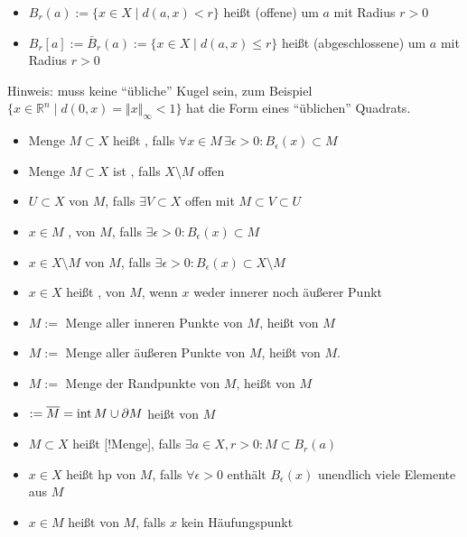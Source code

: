\begin{definition}
    \begin{itemize}
    \item $B_r(a):=\{ x\in X \mid d(a,x) < r \}$ heißt (offene)  um $a$ mit Radius $r > 0$
    \item $B_r[a]:=\bar{B}_r(a):=\{ x\in X \mid d(a,x) \le r \}$ heißt (abgeschlossene)  um $a$ mit Radius $r > 0$
    \end{itemize}
    Hinweis: muss keine "`übliche"' Kugel sein, zum Beispiel $\{ x\in \mathbb{R}^n \mid d(0,x) = \Vert x\Vert_{\infty} < 1 \}$ hat die Form eines "`üblichen"' Quadrats.
    \begin{itemize}
        \item Menge $M\subset X$ heißt , falls $\forall x\in M\,\exists \epsilon > 0: B_\epsilon(x) \subset M$
        \item Menge $M\subset X$ ist , falls $X\setminus M$ offen
        \item $U\subset X$  von $M$, falls $\exists V\subset X$ offen mit $M\subset V\subset U$
        \item $x\in M$ , von $M$, falls $\exists \epsilon > 0: B_\epsilon(x)\subset M$
        \item $x\in X\setminus M$  von $M$, falls $\exists \epsilon > 0: B_\epsilon(x)\subset X\setminus M$
        \item $x\in X$ heißt , von $M$, wenn $x$ weder innerer noch äußerer Punkt
        \item {}$ M:=$ Menge aller inneren Punkte von $M$, heißt  von $M$
        \item {}$M:=$ Menge aller äußeren Punkte von $M$, heißt  von $M$.
        \item {}$M:=$ Menge der Randpunkte von $M$, heißt  von $M$
        \item {}$:=\overline{M} = \operatorname{int} M \cup \partial M$ heißt  von $M$
        \item $M\subset X$ heißt [!Menge], falls $\exists a\in X, r>0: M\subset B_r(a)$
        \item $x\in X$ heißt \gls{hp} von $M$, falls $\forall \epsilon > 0$ enthält $B_\epsilon(x)$ unendlich viele Elemente aus $M$
        \item $x\in M$ heißt  von $M$, falls $x$ kein Häufungspunkt
        \end{itemize}
\end{definition}

